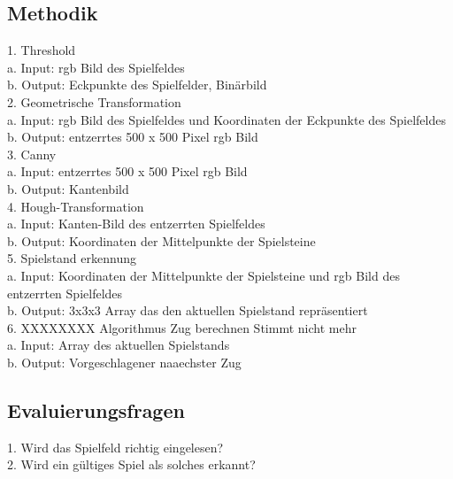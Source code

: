 \documentclass[paper=A4, deutsch]{scrartcl}
\begin{document}
\subsection{Methodik}
1.  Threshold\\
\hspace*{1em} a. Input: rgb Bild des Spielfeldes\\
\hspace*{1em} b. Output: Eckpunkte des Spielfelder, Binärbild\\
2. Geometrische Transformation\\
\hspace*{1em} a. Input: rgb Bild des Spielfeldes und Koordinaten der Eckpunkte des Spielfeldes\\
\hspace*{1em} b. Output: entzerrtes 500 x 500 Pixel rgb Bild\\
3. Canny\\
\hspace*{1em} a. Input: entzerrtes 500 x 500 Pixel rgb Bild\\
\hspace*{1em} b. Output: Kantenbild \\
4. Hough-Transformation \\
\hspace*{1em} a. Input: Kanten-Bild des entzerrten Spielfeldes\\
\hspace*{1em} b. Output: Koordinaten der Mittelpunkte der Spielsteine \\
5. Spielstand erkennung \\
\hspace*{1em} a. Input: Koordinaten der Mittelpunkte der Spielsteine und rgb Bild des entzerrten Spielfeldes\\
\hspace*{1em} b. Output: 3x3x3 Array das den aktuellen Spielstand repräsentiert \\
6. XXXXXXXX Algorithmus Zug berechnen Stimmt nicht mehr\\
\hspace*{1em} a. Input: Array des aktuellen Spielstands \\
\hspace*{1em} b. Output: Vorgeschlagener naaechster Zug

\subsection{Evaluierungsfragen}
1. Wird das Spielfeld richtig eingelesen?\\
2. Wird ein gültiges Spiel als solches erkannt?\\
\end{document}
